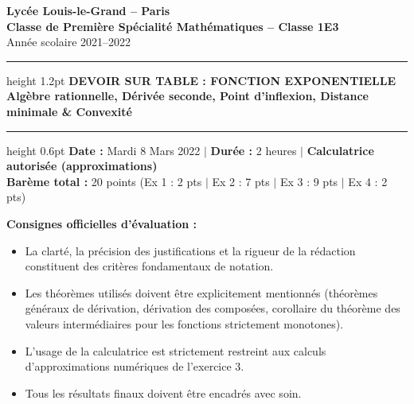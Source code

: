 \documentclass[11pt,a4paper]{article}
\begin{document}
\begin{center}
    {\LARGE \bfseries Lycée Louis-le-Grand -- Paris}\\[0.2cm]
    {\large \textbf{Classe de Première Spécialité Mathématiques -- Classe 1E3}}\\[0.15cm]
    {\normalsize Année scolaire 2021--2022}\\[0.35cm]
    \hrule height 1.2pt
    \vspace{0.25cm}
    {\LARGE \bfseries DEVOIR SUR TABLE : FONCTION EXPONENTIELLE}\\[0.15cm]
    {\large \textbf{Algèbre rationnelle, Dérivée seconde, Point d'inflexion, Distance minimale \& Convexité}}\\[0.2cm]
    \hrule height 0.6pt
    \vspace{0.25cm}
    {\small \textbf{Date :} Mardi 8 Mars 2022 \quad $\vert$ \quad \textbf{Durée :} 2 heures \quad $\vert$ \quad \textbf{Calculatrice autorisée (approximations)}}\\[0.1cm]
    {\small \textbf{Barème total :} 20 points \quad (Ex 1 : 2 pts \quad $\vert$ \quad Ex 2 : 7 pts \quad $\vert$ \quad Ex 3 : 9 pts \quad $\vert$ \quad Ex 4 : 2 pts)}
\end{center}

\vspace{0.3cm}

\begin{tcolorbox}[colback=llglight,colframe=llgblue,arc=1.5mm,boxrule=0.7pt]
\textbf{Consignes officielles d'évaluation :}
\begin{itemize}[leftmargin=*,itemsep=2pt]
    \item La clarté, la précision des justifications et la rigueur de la rédaction constituent des critères fondamentaux de notation.
    \item Les théorèmes utilisés doivent être explicitement mentionnés (théorèmes généraux de dérivation, dérivation des composées, corollaire du théorème des valeurs intermédiaires pour les fonctions strictement monotones).
    \item L'usage de la calculatrice est strictement restreint aux calculs d'approximations numériques de l'exercice 3.
    \item Tous les résultats finaux doivent être encadrés avec soin.
\end{itemize}
\end{tcolorbox}
\end{document}
